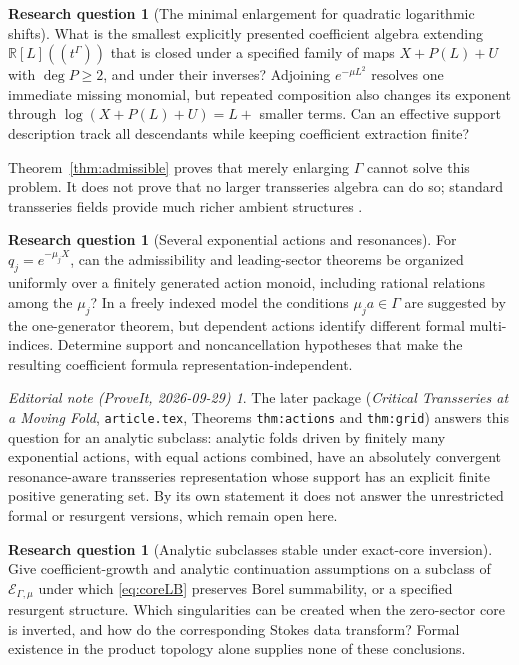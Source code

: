 \documentclass[11pt,a4paper]{article}
\theoremstyle{definition}
\newtheorem{question}[theorem]{Research question}
\theoremstyle{remark}
\newtheorem*{ednote}{Editorial note (ProveIt, 2026-09-29)}
\newcommand{\R}{\mathbb R}
\newcommand{\E}{\mathcal E_{\Gamma,\mu}}
\begin{document}
\begin{question}[The minimal enlargement for quadratic logarithmic shifts]
What is the smallest explicitly presented coefficient algebra extending
$\R[L]((t^\Gamma))$ that is closed under a specified family of maps
$X+P(L)+U$ with $\deg P\ge2$, and under their inverses? Adjoining
$e^{-\mu L^2}$ resolves one immediate missing monomial, but repeated
composition also changes its exponent through
$\log(X+P(L)+U)=L+$ smaller terms. Can an effective support description
track all descendants while keeping coefficient extraction finite?
\end{question}
Theorem~\ref{thm:admissible} proves that merely enlarging $\Gamma$ cannot
solve this problem. It does not prove that no larger transseries algebra
can do so; standard transseries fields provide much richer ambient
structures \cite{vdH,EdgarComposition}.

\begin{question}[Several exponential actions and resonances]
For $q_j=e^{-\mu_jX}$, can the admissibility and leading-sector theorems be
organized uniformly over a finitely generated action monoid, including
rational relations among the $\mu_j$? In a freely indexed model the
conditions $\mu_j a\in\Gamma$ are suggested by the one-generator theorem,
but dependent actions identify different formal multi-indices. Determine
support and noncancellation hypotheses that make the resulting coefficient
formula representation-independent.
\end{question}
\begin{ednote}\label{ed:several-actions}
The later package
(\textit{Critical Transseries at a Moving Fold}, \texttt{article.tex},
Theorems \texttt{thm:actions} and \texttt{thm:grid}) answers this question
for an analytic subclass: analytic folds driven by finitely many
exponential actions, with equal actions combined, have an absolutely
convergent resonance-aware transseries representation whose support has an
explicit finite positive generating set. By its own statement it does not
answer the unrestricted formal or resurgent versions, which remain open
here.
\end{ednote}

\begin{question}[Analytic subclasses stable under exact-core inversion]
Give coefficient-growth and analytic continuation assumptions on a subclass
of $\E$ under which \eqref{eq:coreLB} preserves Borel summability, or a
specified resurgent structure. Which singularities can be created when the
zero-sector core is inverted, and how do the corresponding Stokes data
transform? Formal existence in the product topology alone supplies none
of these conclusions.
\end{question}
\end{document}

